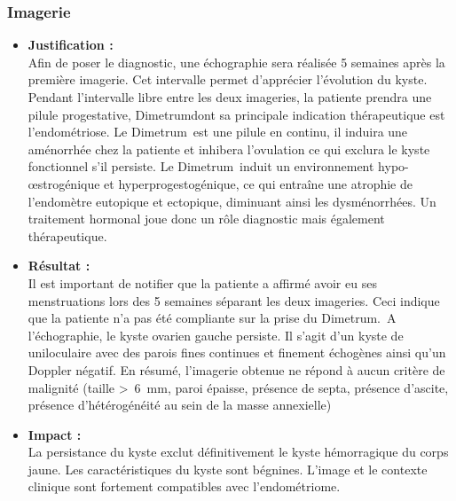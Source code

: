 \subsubsection{Imagerie}

\begin{itemize}[label=\textbullet]
    \item \textbf{Justification :}\\
    Afin de poser le diagnostic, une échographie sera réalisée 5 semaines après la première imagerie. Cet intervalle permet d’apprécier l’évolution du kyste. Pendant l’intervalle libre entre les deux imageries, la patiente prendra une pilule progestative, Dimetrum\textregistered dont sa principale indication thérapeutique est l’endométriose. Le Dime\-trum\textregistered\ est une pilule en continu, il induira une aménorrhée chez la patiente et inhibera l’ovulation ce qui exclura le kyste fonctionnel s’il persiste. Le Dimetrum\textregistered\ induit un environnement hypo-œstrogénique et hyperprogestogénique, ce qui entraîne une atrophie de l'endomètre eutopique et ectopique, diminuant ainsi les dysménorrhées. Un traitement hormonal joue donc un rôle diagnostic mais également thérapeutique.
    
    \item \textbf{Résultat :}\\
    Il est important de notifier que la patiente a affirmé avoir eu ses menstruations lors des 5 semaines séparant les deux imageries. Ceci indique que la patiente n’a pas été compliante sur la prise du Dimetrum\textregistered.\, A l’échographie, le kyste ovarien gauche persiste. Il s’agit d’un kyste de  uniloculaire avec des parois fines continues et finement échogènes ainsi qu’un Doppler négatif. En résumé, l’imagerie obtenue ne répond à aucun critère de malignité (taille >~\qty{6}{\mm}, paroi épaisse, présence de septa, présence d’ascite, présence d’hétérogénéité au sein de la masse annexielle)
    
    \item \textbf{Impact :}\\
    La persistance du kyste exclut définitivement le kyste hémorragique du corps jaune. Les caractéristiques du kyste sont bégnines. L’image et le contexte clinique sont fortement compatibles avec l’endométriome.
\end{itemize}

